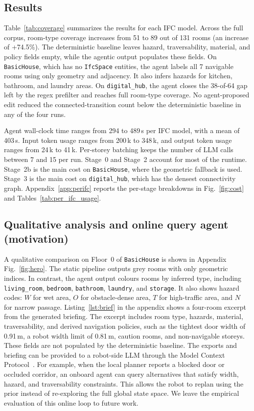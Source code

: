 \documentclass[a4paper, 10pt, conference]{ieeeconf}
\begin{document}
\subsection{Results}
Table~\ref{tab:coverage} summarizes the results for each IFC model. Across the full corpus, room-type coverage increases from 51 to 89 out of 131 rooms (an increase of +74.5\%). The deterministic baseline leaves hazard, traversability, material, and policy fields empty, while the agentic output populates these fields. On \texttt{BasicHouse}, which has no \texttt{IfcSpace} entities, the agent labels all 7 navigable rooms using only geometry and adjacency. It also infers hazards for kitchen, bathroom, and laundry areas. On \texttt{digital\_hub}, the agent closes the 38-of-64 gap left by the regex prefilter and reaches full room-type coverage. No agent-proposed edit reduced the connected-transition count below the deterministic baseline in any of the four runs.

Agent wall-clock time ranges from 294 to 489\,s per IFC model, with a mean of 403\,s. Input token usage ranges from 200\,k to 348\,k, and output token usage ranges from 24\,k to 41\,k. Per-storey batching keeps the number of LLM calls between 7 and 15 per run. Stage~0 and Stage~2 account for most of the runtime. Stage~2b is the main cost on \texttt{BasicHouse}, where the geometric fallback is used. Stage~3 is the main cost on \texttt{digital\_hub}, which has the densest connectivity graph. Appendix~\ref{app:perifc} reports the per-stage breakdowns in Fig.~\ref{fig:cost} and Tables~\ref{tab:per_ifc_usage}.

\subsection{Qualitative analysis and online query agent (motivation)}
A qualitative comparison on Floor~0 of \texttt{BasicHouse} is shown in Appendix Fig.~\ref{fig:hero}. The static pipeline outputs grey rooms with only geometric indices. In contrast, the agent output colours rooms by inferred type, including \texttt{living\_room}, \texttt{bedroom}, \texttt{bathroom}, \texttt{laundry}, and \texttt{storage}. It also shows hazard codes: $W$ for wet area, $O$ for obstacle-dense area, $T$ for high-traffic area, and $N$ for narrow passage. Listing~\ref{lst:brief} in the appendix shows a four-room excerpt from the generated briefing. The excerpt includes room type, hazards, material, traversability, and derived navigation policies, such as the tightest door width of 0.91\,m, a robot width limit of 0.81\,m, caution rooms, and non-navigable storeys. These fields are not populated by the deterministic baseline. The exports and briefing can be provided to a robot-side LLM through the Model Context Protocol~\cite{anthropic2024mcp}. For example, when the local planner reports a blocked door or occluded corridor, an onboard agent can query alternatives that satisfy width, hazard, and traversability constraints. This allows the robot to replan using the prior instead of re-exploring the full global state space. We leave the empirical evaluation of this online loop to future work.
\end{document}
